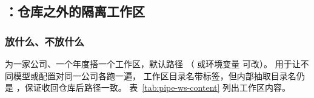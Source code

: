\subsection{：仓库之外的隔离工作区}
\label{sec:pipe-build}

\subsubsection{放什么、不放什么}

 为一家公司、一个年度搭一个工作区，默认路径 
（ 或环境变量  可改）。 用于让不同模型或配置对同一公司各跑一遍，
工作区目录名带标签，但内部抽取目录名仍是 ，保证收回仓库后路径一致。
表~\ref{tab:pipe-ws-content} 列出工作区内容。


